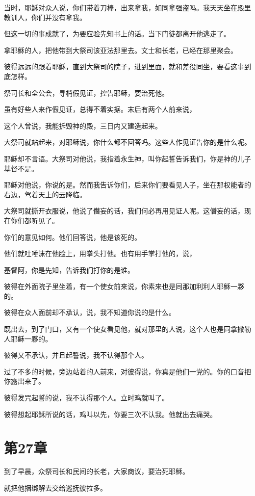 \documentclass[12pt,oneside]{book}
\begin{document}
当时，耶稣对众人说，你们带着刀棒，出来拿我，如同拿强盗吗。我天天坐在殿里教训人，你们并没有拿我。

但这一切的事成就了，为要应验先知书上的话。当下门徒都离开他逃走了。

拿耶稣的人，把他带到大祭司该亚法那里去。文士和长老，已经在那里聚会。

彼得远远的跟着耶稣，直到大祭司的院子，进到里面，就和差役同坐，要看这事到底怎样。

祭司长和全公会，寻梢假见证，控告耶稣，要治死他。

虽有好些人来作假见证，总得不着实据。末后有两个人前来说，

这个人曾说，我能拆毁神的殿，三日内又建造起来。

大祭司就站起来，对耶稣说，你什么都不回答吗。这些人作见证告你的是什么呢。

耶稣却不言语。大祭司对他说，我指着永生神，叫你起誓告诉我们，你是神的儿子基督不是。

耶稣对他说，你说的是。然而我告诉你们，后来你们要看见人子，坐在那权能者的右边，驾着天上的云降临。

大祭司就撕开衣服说，他说了僭妄的话，我们何必再用见证人呢。这僭妄的话，现在你们都听见了。

你们的意见如何。他们回答说，他是该死的。

他们就吐唾沫在他脸上，用拳头打他。也有用手掌打他的，说，

基督阿，你是先知，告诉我们打你的是谁。

彼得在外面院子里坐着，有一个使女前来说，你素来也是同那加利利人耶稣一夥的。

彼得在众人面前却不承认，说，我不知道你说的是什么。

既出去，到了门口，又有一个使女看见他，就对那里的人说，这个人也是同拿撒勒人耶稣一夥的。

彼得又不承认，并且起誓说，我不认得那个人。

过了不多的时候，旁边站着的人前来，对彼得说，你真是他们一党的。你的口音把你露出来了。

彼得发咒起誓的说，我不认得那个人。立时鸡就叫了。

彼得想起耶稣所说的话，鸡叫以先，你要三次不认我。他就出去痛哭。

\chapter{第27章}
到了早晨，众祭司长和民间的长老，大家商议，要治死耶稣。

就把他捆绑解去交给巡抚彼拉多。
\end{document}
